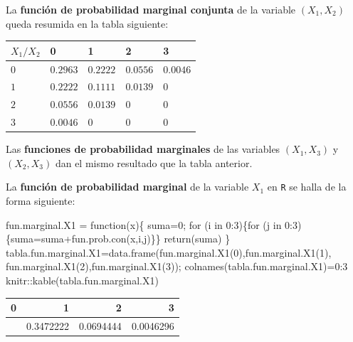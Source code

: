 \documentclass[
  letterpaper,
  DIV=11,
  numbers=noendperiod]{scrreprt}
\newenvironment{Shaded}{\begin{snugshade}}{\end{snugshade}}
\newcommand{\ControlFlowTok}[1]{\textcolor[rgb]{0.00,0.23,0.31}{#1}}
\newcommand{\DecValTok}[1]{\textcolor[rgb]{0.68,0.00,0.00}{#1}}
\newcommand{\FunctionTok}[1]{\textcolor[rgb]{0.28,0.35,0.67}{#1}}
\newcommand{\NormalTok}[1]{\textcolor[rgb]{0.00,0.23,0.31}{#1}}
\newcommand{\OtherTok}[1]{\textcolor[rgb]{0.00,0.23,0.31}{#1}}
\newcommand{\SpecialCharTok}[1]{\textcolor[rgb]{0.37,0.37,0.37}{#1}}
\begin{document}
La \textbf{función de probabilidad marginal conjunta} de la variable
\((X_1,X_2)\) queda resumida en la tabla siguiente:

\begin{longtable}[]{@{}lllll@{}}
\toprule\noalign{}
\(X_1/X_2\) & 0 & 1 & 2 & 3 \\
\midrule\noalign{}
\endhead
\bottomrule\noalign{}
\endlastfoot
\(0\) & \(0.2963\) & \(0.2222\) & \(0.0556\) & \(0.0046\) \\
\(1\) & \(0.2222\) & \(0.1111\) & \(0.0139\) & \(0\) \\
\(2\) & \(0.0556\) & \(0.0139\) & \(0\) & \(0\) \\
\(3\) & \(0.0046\) & \(0\) & \(0\) & \(0\) \\
\end{longtable}

Las \textbf{funciones de probabilidad marginales} de las variables
\((X_1,X_3)\) y \((X_2,X_3)\) dan el mismo resultado que la tabla
anterior.

La \textbf{función de probabilidad marginal} de la variable \(X_1\) en
\texttt{R} se halla de la forma siguiente:

\begin{Shaded}
\begin{Highlighting}[]
\NormalTok{fun.marginal.X1 }\OtherTok{=} \ControlFlowTok{function}\NormalTok{(x)\{}
\NormalTok{  suma}\OtherTok{=}\DecValTok{0}\NormalTok{;}
  \ControlFlowTok{for}\NormalTok{ (i }\ControlFlowTok{in} \DecValTok{0}\SpecialCharTok{:}\DecValTok{3}\NormalTok{)\{}\ControlFlowTok{for}\NormalTok{ (j }\ControlFlowTok{in} \DecValTok{0}\SpecialCharTok{:}\DecValTok{3}\NormalTok{)\{suma}\OtherTok{=}\NormalTok{suma}\SpecialCharTok{+}\FunctionTok{fun.prob.con}\NormalTok{(x,i,j)\}\}}
  \FunctionTok{return}\NormalTok{(suma)}
\NormalTok{\}}
\NormalTok{tabla.fun.marginal.X1}\OtherTok{=}\FunctionTok{data.frame}\NormalTok{(}\FunctionTok{fun.marginal.X1}\NormalTok{(}\DecValTok{0}\NormalTok{),}\FunctionTok{fun.marginal.X1}\NormalTok{(}\DecValTok{1}\NormalTok{),}
                            \FunctionTok{fun.marginal.X1}\NormalTok{(}\DecValTok{2}\NormalTok{),}\FunctionTok{fun.marginal.X1}\NormalTok{(}\DecValTok{3}\NormalTok{));}
\FunctionTok{colnames}\NormalTok{(tabla.fun.marginal.X1)}\OtherTok{=}\DecValTok{0}\SpecialCharTok{:}\DecValTok{3}
\NormalTok{knitr}\SpecialCharTok{::}\FunctionTok{kable}\NormalTok{(tabla.fun.marginal.X1)}
\end{Highlighting}
\end{Shaded}

\begin{longtable}[]{@{}rrrr@{}}
\toprule\noalign{}
0 & 1 & 2 & 3 \\
\midrule\noalign{}
\endhead
\bottomrule\noalign{}
\endlastfoot
0.5787037 & 0.3472222 & 0.0694444 & 0.0046296 \\
\end{longtable}
\end{document}
